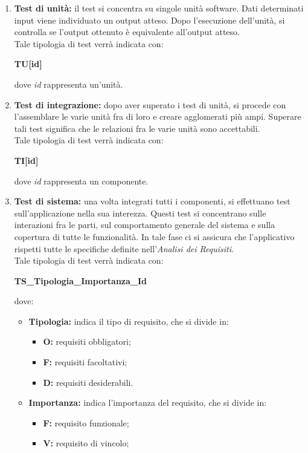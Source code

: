 \begin{enumerate}
	\item \textbf{Test di unità:} il test si concentra su singole unità software. Dati determinati input viene individuato un output atteso. Dopo l'esecuzione dell'unità, si controlla se l'output ottenuto è equivalente all'output atteso.\\
Tale tipologia di test verrà indicata con:
\begin{center}
	\textbf{TU[id]}
\end{center}
dove \textit{id} rappresenta un’unità.
	\item \textbf{Test di integrazione:} dopo aver superato i test di unità, si procede con l'assemblare le varie unità fra di loro e creare agglomerati più ampi. Superare tali test significa che le relazioni fra le varie unità sono accettabili.\\
Tale tipologia di test verrà indicata con:
\begin{center}
	\textbf{TI[id]}
\end{center}
dove \textit{id} rappresenta un componente.
	\item \textbf{Test di sistema:} una volta integrati tutti i componenti, si effettuano test sull'applicazione nella sua interezza. Questi test si concentrano sulle interazioni fra le parti, sul comportamento generale del sistema e sulla copertura di tutte le funzionalità. In tale fase ci si assicura che l'applicativo rispetti tutte le specifiche definite nell'\textit{Analisi dei Requisiti}.\\
Tale tipologia di test verrà indicata con:
\begin{center}
	\textbf{TS\_Tipologia\_Importanza\_Id}
\end{center}
dove:
\begin{itemize}
	\item \textbf{Tipologia:} indica il tipo di requisito, che si divide in:
	\begin{itemize}
		\item \textbf{O:} requisiti obbligatori;
		\item \textbf{F:} requisiti facoltativi;
		\item \textbf{D:} requisiti desiderabili.
	\end{itemize}
	\item \textbf{Importanza:} indica l'importanza del requisito, che si divide in:
	\begin{itemize}
		\item \textbf{F:} requisito funzionale;
		\item \textbf{V:} requisito di vincolo;

\end{itemize}
\end{itemize}
\end{enumerate}
